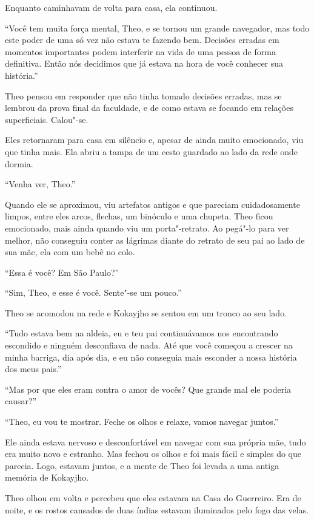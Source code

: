 Enquanto caminhavam de volta para casa, ela continuou.

``Você tem muita força mental, Theo, e se tornou um grande navegador,
mas todo este poder de uma só vez não estava te fazendo bem. Decisões
erradas em momentos importantes podem interferir na vida de uma pessoa
de forma definitiva. Então nós decidimos que já estava na hora de você
conhecer sua história.''

Theo pensou em responder que não tinha tomado decisões erradas, mas se
lembrou da prova final da faculdade, e de como estava se focando em
relações superficiais. Calou"-se.

Eles retornaram para casa em silêncio e, apesar de ainda muito
emocionado, viu que tinha mais. Ela abriu a tampa de um cesto guardado
ao lado da rede onde dormia.

``Venha ver, Theo.''

Quando ele se aproximou, viu artefatos antigos e que pareciam
cuidadosamente limpos, entre eles arcos, flechas, um binóculo e uma
chupeta. Theo ficou emocionado, mais ainda quando viu um porta"-retrato.
Ao pegá"-lo para ver melhor, não conseguiu conter as lágrimas diante do
retrato de seu pai ao lado de sua mãe, ela com um bebê no colo.

``Essa é você? Em São Paulo?''

``Sim, Theo, e esse é você. Sente"-se um pouco.''

Theo se acomodou na rede e Kokayjho se sentou em um tronco ao seu lado.

``Tudo estava bem na aldeia, eu e teu pai continuávamos nos encontrando
escondido e ninguém desconfiava de nada. Até que você começou a crescer
na minha barriga, dia após dia, e eu não conseguia mais esconder a nossa
história dos meus pais.''

``Mas por que eles eram contra o amor de vocês? Que grande mal ele
poderia causar?''

``Theo, eu vou te mostrar. Feche os olhos e relaxe, vamos navegar
juntos.''

Ele ainda estava nervoso e desconfortável em navegar com sua própria
mãe, tudo era muito novo e estranho. Mas fechou os olhos e foi mais
fácil e simples do que parecia. Logo, estavam juntos, e a mente de
Theo foi levada a uma antiga memória de Kokayjho.

\asterisc


Theo olhou em volta e percebeu que eles estavam na Casa do Guerreiro.
Era de noite, e os rostos cansados de duas índias estavam iluminados pelo
fogo das velas.

